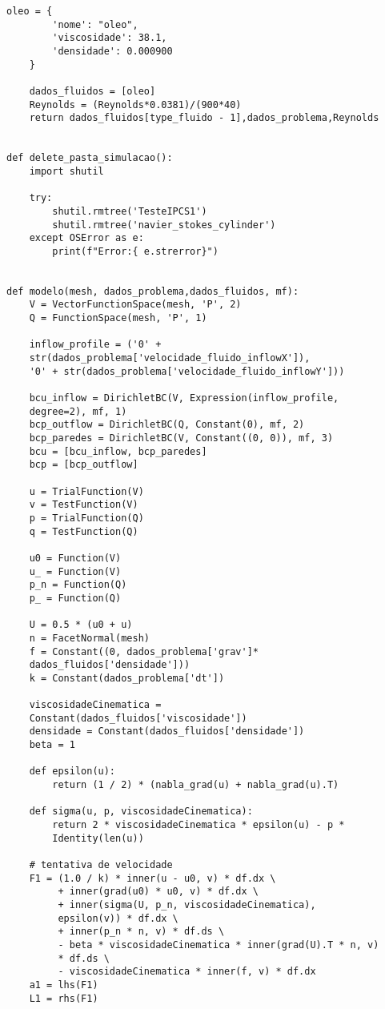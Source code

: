 \begin{lstlisting}[title=\phantom{}]
    oleo = {
        'nome': "oleo",
        'viscosidade': 38.1,
        'densidade': 0.000900
    }

    dados_fluidos = [oleo]
    Reynolds = (Reynolds*0.0381)/(900*40)
    return dados_fluidos[type_fluido - 1],dados_problema,Reynolds


def delete_pasta_simulacao():
    import shutil

    try:
        shutil.rmtree('TesteIPCS1')
        shutil.rmtree('navier_stokes_cylinder')
    except OSError as e:
        print(f"Error:{ e.strerror}")


def modelo(mesh, dados_problema,dados_fluidos, mf):
    V = VectorFunctionSpace(mesh, 'P', 2)  
    Q = FunctionSpace(mesh, 'P', 1)  

    inflow_profile = ('0' +
    str(dados_problema['velocidade_fluido_inflowX']),
    '0' + str(dados_problema['velocidade_fluido_inflowY']))

    bcu_inflow = DirichletBC(V, Expression(inflow_profile,
    degree=2), mf, 1)
    bcp_outflow = DirichletBC(Q, Constant(0), mf, 2)
    bcp_paredes = DirichletBC(V, Constant((0, 0)), mf, 3)
    bcu = [bcu_inflow, bcp_paredes]  
    bcp = [bcp_outflow]  

    u = TrialFunction(V)
    v = TestFunction(V)
    p = TrialFunction(Q)
    q = TestFunction(Q)

    u0 = Function(V)
    u_ = Function(V)
    p_n = Function(Q)
    p_ = Function(Q)

    U = 0.5 * (u0 + u)
    n = FacetNormal(mesh)
    f = Constant((0, dados_problema['grav']*
    dados_fluidos['densidade']))
    k = Constant(dados_problema['dt'])

    viscosidadeCinematica =
    Constant(dados_fluidos['viscosidade'])
    densidade = Constant(dados_fluidos['densidade'])
    beta = 1

    def epsilon(u):
        return (1 / 2) * (nabla_grad(u) + nabla_grad(u).T)

    def sigma(u, p, viscosidadeCinematica):
        return 2 * viscosidadeCinematica * epsilon(u) - p *
        Identity(len(u))

    # tentativa de velocidade
    F1 = (1.0 / k) * inner(u - u0, v) * df.dx \
         + inner(grad(u0) * u0, v) * df.dx \
         + inner(sigma(U, p_n, viscosidadeCinematica),
         epsilon(v)) * df.dx \
         + inner(p_n * n, v) * df.ds \
         - beta * viscosidadeCinematica * inner(grad(U).T * n, v)
         * df.ds \
         - viscosidadeCinematica * inner(f, v) * df.dx
    a1 = lhs(F1)
    L1 = rhs(F1)


\end{lstlisting}
